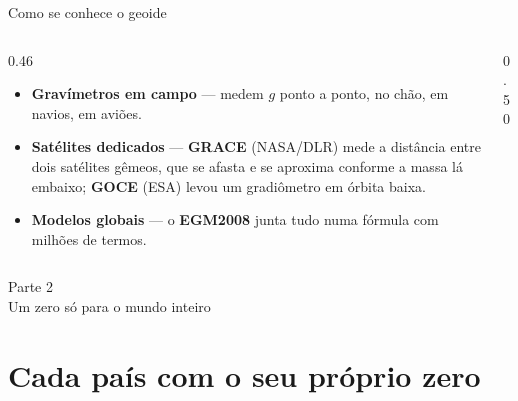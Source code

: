 \documentclass[aspectratio=169,11pt]{beamer}
\begin{document}
\begin{frame}{Como se conhece o geoide}
  \begin{columns}[T]
    \begin{column}{0.46\textwidth}
      \begin{itemize}
        \item \textbf{Gravímetros em campo} --- medem $g$ ponto a ponto, no chão, em
              navios, em aviões.
        \item \textbf{Satélites dedicados} --- \textbf{GRACE} (NASA/DLR) mede a distância
              entre dois satélites gêmeos, que se afasta e se aproxima conforme a massa lá
              embaixo; \textbf{GOCE} (ESA) levou um gradiômetro em órbita baixa.
        \item \textbf{Modelos globais} --- o \textbf{EGM2008} junta tudo numa fórmula com
              milhões de termos.
      \end{itemize}
    \end{column}
    \begin{column}{0.50\textwidth}
      \centering
    \end{column}
  \end{columns}
\end{frame}

\begin{frame}[standout]
  Parte 2\\[6pt]
  {\normalsize Um zero só para o mundo inteiro}
\end{frame}

\section{Cada país com o seu próprio zero}
\end{document}
